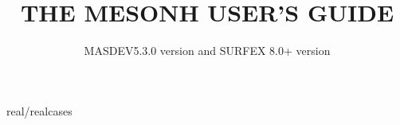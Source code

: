 \documentclass[11pt,a4paper]{book}
\begin{document}
\baselineskip=18pt
\newcommand{\dfrac}[2]{\frac{\displaystyle#1}{\displaystyle#2}}
\parindent=25pt




\begin{titlepage}
\title{ {\bf THE MESONH USER'S GUIDE}}
\author{MASDEV5.3.0 version and SURFEX 8.0+ version }
\end{titlepage}
\maketitle
\thispagestyle{empty}
\tableofcontents








 {real/realcases}







\appendix





\printindex
{}
{}
\end{document}
